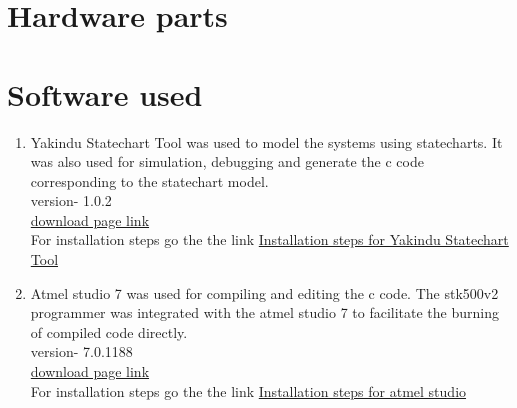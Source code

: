\documentclass[a4paper,12pt,oneside]{book}
\begin{document}
\section{Hardware parts}

\section{Software used}
\begin{enumerate}
  \item  Yakindu Statechart Tool was used to model the systems using statecharts. It was also used for simulation, debugging and generate the c code corresponding to the statechart model.
   \\
version-  1.0.2
\\
\href{https://info.itemis.com/state-machine/download-yakindu-statechart-tools}{download page link}
\\
For installation steps go the the link \href{https://www.itemis.com/en/yakindu/state-machine/documentation/installation/}{Installation steps for Yakindu Statechart Tool}

 \item Atmel studio 7 was used for compiling and editing the c code. The stk500v2 programmer was integrated with the atmel studio 7 to facilitate the burning of compiled code directly. 
   \\
   version- 7.0.1188 
   \\
   \href{http://www.atmel.com/tools/atmelstudio.aspx#download}{download page link}
   \\
 For installation steps go the the link \href{https://www.youtube.com/watch?v=q8ruiOJhNbk}{Installation steps for atmel studio}
 
  
  
\end{enumerate}
\end{document}
